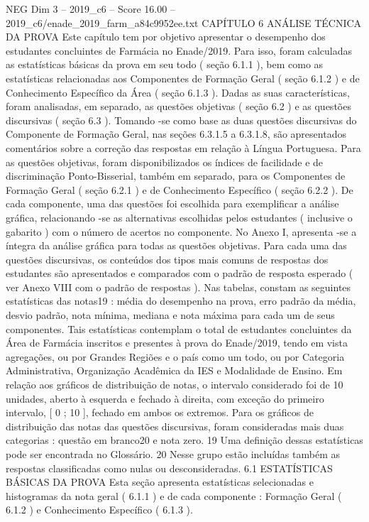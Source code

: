 \begin{textsample}{NEG Dim 3 – 2019\_c6 – Score 16.00 – 2019\_c6/enade\_2019\_farm\_a84c9952ee.txt}  \label{ex:f3_neg_272}
CAPÍTULO 6 ANÁLISE TÉCNICA DA PROVA Este capítulo tem por objetivo apresentar o desempenho dos estudantes concluintes de Farmácia no Enade/2019.
Para isso, foram calculadas as estatísticas básicas da prova em seu todo ( seção 6.1.1 ), bem como as estatísticas relacionadas aos Componentes de Formação Geral ( seção 6.1.2 ) e de Conhecimento Específico da Área ( seção 6.1.3 ).
Dadas as suas características, foram analisadas, em separado, as questões objetivas ( seção 6.2 ) e as questões discursivas ( seção 6.3 ).
Tomando -se como base as duas questões discursivas do Componente de Formação Geral, nas seções 6.3.1.5 a 6.3.1.8, são apresentados comentários sobre a correção das respostas em relação à Língua Portuguesa.
Para as questões objetivas, foram disponibilizados os índices de facilidade e de discriminação Ponto-Bisserial, também em separado, para os Componentes de Formação Geral ( seção 6.2.1 ) e de Conhecimento Específico ( seção 6.2.2 ).
De cada componente, uma das questões foi escolhida para exemplificar a análise gráfica, relacionando -se as alternativas escolhidas pelos estudantes ( inclusive o gabarito ) com o número de acertos no componente.
No Anexo I, apresenta -se a íntegra da análise gráfica para todas as questões objetivas.
Para cada uma das questões discursivas, os conteúdos dos tipos mais comuns de respostas dos estudantes são apresentados e comparados com o padrão de resposta esperado ( ver Anexo VIII com o padrão de respostas ).
Nas tabelas, constam as seguintes estatísticas das notas19 : média do desempenho na prova, erro padrão da média, desvio padrão, nota mínima, mediana e nota máxima para cada um de seus componentes.
Tais estatísticas contemplam o total de estudantes concluintes da Área de Farmácia inscritos e presentes à prova do Enade/2019, tendo em vista agregações, ou por Grandes Regiões e o país como um todo, ou por Categoria Administrativa, Organização Acadêmica da IES e Modalidade de Ensino.
Em relação aos gráficos de distribuição de notas, o intervalo considerado foi de 10 unidades, aberto à esquerda e fechado à direita, com exceção do primeiro intervalo, [ 0 ; 10 ], fechado em ambos os extremos.
Para os gráficos de distribuição das notas das questões discursivas, foram consideradas mais duas categorias : questão em branco20 e nota zero. 19 Uma definição dessas estatísticas pode ser encontrada no Glossário. 20 Nesse grupo estão incluídas também as respostas classificadas como nulas ou desconsideradas. 6.1 ESTATÍSTICAS BÁSICAS DA PROVA Esta seção apresenta estatísticas selecionadas e histogramas da nota geral ( 6.1.1 ) e de cada componente : Formação Geral ( 6.1.2 ) e Conhecimento Específico ( 6.1.3 ).

\end{textsample}
